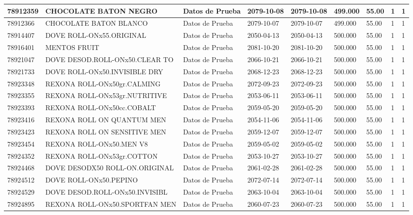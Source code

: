 \documentclass[a4paper,12pt]{article}
\begin{document}
\begin{landscape}
\begin{longtable}{|p{4cm}|p{2.5cm}|p{2.5cm}|p{1.8cm}|p{1.8cm}|p{1cm}|p{1cm}|p{3cm}|p{3cm}||}
78912359 & CHOCOLATE BATON NEGRO & Datos de Prueba & 2079-10-08 & 2079-10-08 & 499.000 & 55.00 & 1 & 1 \\ \hline 
78912366 & CHOCOLATE BATON BLANCO & Datos de Prueba & 2079-10-07 & 2079-10-07 & 499.000 & 55.00 & 1 & 1 \\ \hline 
78914407 & DOVE ROLL-ONx55.ORIGINAL & Datos de Prueba & 2050-04-13 & 2050-04-13 & 500.000 & 55.00 & 1 & 1 \\ \hline 
78916401 & MENTOS FRUIT & Datos de Prueba & 2081-10-20 & 2081-10-20 & 500.000 & 55.00 & 1 & 1 \\ \hline 
78921047 & DOVE DESOD.ROLL-ONx50.CLEAR TO & Datos de Prueba & 2066-10-21 & 2066-10-21 & 500.000 & 55.00 & 1 & 1 \\ \hline 
78921733 & DOVE ROLL-ONx50.INVISIBLE DRY & Datos de Prueba & 2068-12-23 & 2068-12-23 & 500.000 & 55.00 & 1 & 1 \\ \hline 
78923348 & REXONA ROLL-ONx50gr.CALMING & Datos de Prueba & 2072-09-23 & 2072-09-23 & 500.000 & 55.00 & 1 & 1 \\ \hline 
78923355 & REXONA ROLL-ONx53gr.NUTRITIVE & Datos de Prueba & 2053-06-11 & 2053-06-11 & 500.000 & 55.00 & 1 & 1 \\ \hline 
78923393 & REXONA ROLL-ONx50cc.COBALT & Datos de Prueba & 2059-05-20 & 2059-05-20 & 500.000 & 55.00 & 1 & 1 \\ \hline 
78923416 & REXONA ROLL ON QUANTUM MEN & Datos de Prueba & 2054-11-06 & 2054-11-06 & 500.000 & 55.00 & 1 & 1 \\ \hline 
78923423 & REXONA ROLL ON SENSITIVE MEN & Datos de Prueba & 2059-12-07 & 2059-12-07 & 500.000 & 55.00 & 1 & 1 \\ \hline 
78923454 & REXONA ROLL-ONx50.MEN V8 & Datos de Prueba & 2059-05-02 & 2059-05-02 & 500.000 & 55.00 & 1 & 1 \\ \hline 
78924352 & REXONA ROLL-ONx53gr.COTTON & Datos de Prueba & 2053-10-27 & 2053-10-27 & 500.000 & 55.00 & 1 & 1 \\ \hline 
78924468 & DOVE DESODX50 ROLL-ON.ORIGINAL & Datos de Prueba & 2061-02-28 & 2061-02-28 & 500.000 & 55.00 & 1 & 1 \\ \hline 
78924512 & DOVE ROLL-ONx50.PEPINO & Datos de Prueba & 2072-07-14 & 2072-07-14 & 500.000 & 55.00 & 1 & 1 \\ \hline 
78924529 & DOVE DESOD.ROLL-ONx50.INVISIBL & Datos de Prueba & 2063-10-04 & 2063-10-04 & 500.000 & 55.00 & 1 & 1 \\ \hline 
78924895 & REXONA ROLL-ONx50.SPORTFAN MEN & Datos de Prueba & 2060-07-23 & 2060-07-23 & 500.000 & 55.00 & 1 & 1 \\ \hline 

\end{longtable}
\end{landscape}
\end{document}
